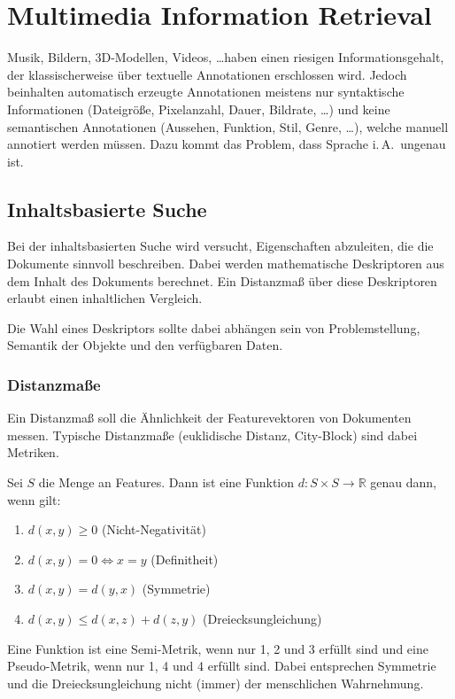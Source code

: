 \documentclass[a4paper, 11pt, accentcolor = tud3b]{tudreport}
\newcommand{\R}{\mathbb{R}}
\newcommand{\iA}{i.\,A.~}
\begin{document}
	\chapter{Multimedia Information Retrieval}
		Musik, Bildern, 3D-Modellen, Videos, \dots haben einen riesigen Informationsgehalt, der klassischerweise über textuelle Annotationen erschlossen wird. Jedoch beinhalten automatisch erzeugte Annotationen meistens nur syntaktische Informationen (Dateigröße, Pixelanzahl, Dauer, Bildrate, \dots) und keine semantischen Annotationen (Aussehen, Funktion, Stil, Genre, \dots), welche manuell annotiert werden müssen. Dazu kommt das Problem, dass Sprache \iA ungenau ist.

		\section{Inhaltsbasierte Suche}
			Bei der inhaltsbasierten Suche wird versucht, Eigenschaften abzuleiten, die die Dokumente sinnvoll beschreiben. Dabei werden mathematische Deskriptoren aus dem Inhalt des Dokuments berechnet. Ein Distanzmaß über diese Deskriptoren erlaubt einen inhaltlichen Vergleich.
			
			Die Wahl eines Deskriptors sollte dabei abhängen sein von Problemstellung, Semantik der Objekte und den verfügbaren Daten.

			\subsection{Distanzmaße}
				Ein Distanzmaß soll die Ähnlichkeit der Featurevektoren von Dokumenten messen. Typische Distanzmaße (euklidische Distanz, City-Block) sind dabei Metriken.
				
				Sei \(S\) die Menge an Features. Dann ist eine Funktion \( d : S \times S \to \R \) genau dann, wenn gilt:
				\begin{enumerate}
					\item \( d(x, y) \geq 0 \) (Nicht-Negativität)
					\item \( d(x, y) = 0 \iff x = y \) (Definitheit)
					\item \( d(x, y) = d(y, x) \) (Symmetrie)
					\item \( d(x, y) \leq d(x, z) + d(z, y) \) (Dreiecksungleichung)
				\end{enumerate}
				Eine Funktion ist eine Semi-Metrik, wenn nur 1, 2 und 3 erfüllt sind und eine Pseudo-Metrik, wenn nur 1, 4 und 4 erfüllt sind. Dabei entsprechen Symmetrie und die Dreiecksungleichung nicht (immer) der menschlichen Wahrnehmung.
	
\end{document}
